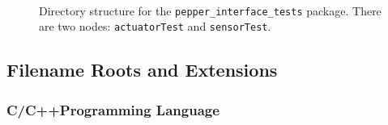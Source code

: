 \documentclass{CSSRforAfrica}
\begin{document}
\begin{appendices}
\begin{figure}[thb]
\begin{multicols}{3}
~~~~~~~~~~~~~~~~~~~~~

\end{multicols}
\cprotect\caption{Directory structure for the  {\small \verb+pepper_interface_tests+} package. There are two nodes: {\small \verb+actuatorTest+} and {\small \verb+sensorTest+}.  }
\label{fig:tests}       
\end{figure}


\newpage

\subsection{Filename Roots and Extensions}

\subsubsection{C/C++Programming Language}


\end{appendices}
\end{document}
